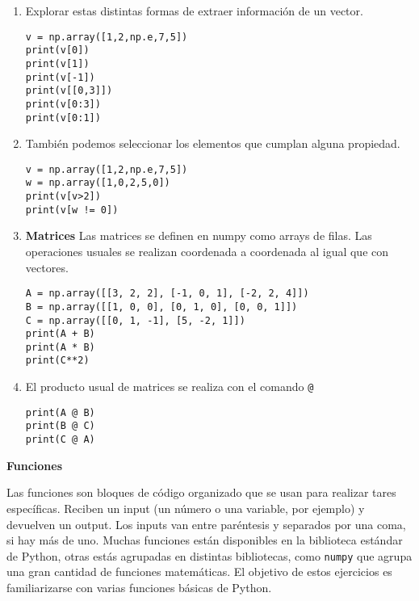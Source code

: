 \documentclass[a4paper,11pt]{article}
\theoremstyle{definition}
\begin{document}
\begin{enumerate}
\item Explorar estas distintas formas de extraer información de un vector.
\begin{lstlisting}
v = np.array([1,2,np.e,7,5])
print(v[0])
print(v[1])
print(v[-1])
print(v[[0,3]])
print(v[0:3])
print(v[0:1])
\end{lstlisting}

\item También podemos seleccionar los elementos que cumplan alguna propiedad.
\begin{lstlisting}
v = np.array([1,2,np.e,7,5])
w = np.array([1,0,2,5,0])
print(v[v>2])
print(v[w != 0])
\end{lstlisting}

\item \textbf{Matrices} Las matrices se definen en numpy como arrays de filas. Las operaciones usuales se realizan coordenada a coordenada al igual que con vectores.
\begin{lstlisting}
A = np.array([[3, 2, 2], [-1, 0, 1], [-2, 2, 4]])
B = np.array([[1, 0, 0], [0, 1, 0], [0, 0, 1]])
C = np.array([[0, 1, -1], [5, -2, 1]])
print(A + B)
print(A * B)
print(C**2)
\end{lstlisting}

\item El producto usual de matrices se realiza con el comando \lstinline{@}
\begin{lstlisting}
print(A @ B)
print(B @ C)
print(C @ A)
\end{lstlisting}

\end{enumerate}
\textbf{\large Funciones}

Las funciones son bloques de código organizado que se usan para realizar tares específicas. Reciben un input (un número o una variable, por ejemplo) y devuelven un output. Los inputs van entre par\'entesis y separados por una coma, si hay m\'as de uno. Muchas funciones están disponibles en la biblioteca est\'andar de Python, otras estás agrupadas en distintas bibliotecas, como \lstinline{numpy} que agrupa una gran cantidad de funciones matemáticas. El objetivo de estos ejercicios es familiarizarse con varias funciones básicas de Python.
\end{document}

